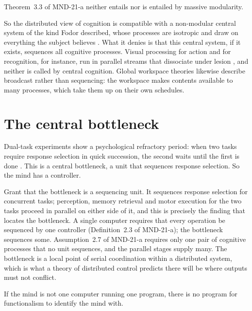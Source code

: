 \documentclass{situationist-preprint}
\begin{document}
\begin{corollary}\label{c:mod}
Theorem~3.3 of MND-21-a neither entails nor is entailed by massive modularity.
\end{corollary}

So the distributed view of cognition is compatible with a non-modular central system of the kind Fodor described, whose processes are isotropic and draw on everything the subject believes \citep{Fodor2000}. What it denies is that this central system, if it exists, sequences all cognitive processes. Visual processing for action and for recognition, for instance, run in parallel streams that dissociate under lesion \citep{MilnerGoodale1995}, and neither is called by central cognition. Global workspace theories \citep{Baars1988} likewise describe broadcast rather than sequencing: the workspace makes contents available to many processes, which take them up on their own schedules.

\section{The central bottleneck}

\begin{objection}
Dual-task experiments show a psychological refractory period: when two tasks require response selection in quick succession, the second waits until the first is done \citep{Pashler1994}. This is a central bottleneck, a unit that sequences response selection. So the mind has a controller.
\end{objection}

\begin{reply}
Grant that the bottleneck is a sequencing unit. It sequences response selection for concurrent tasks; perception, memory retrieval and motor execution for the two tasks proceed in parallel on either side of it, and this is precisely the finding that locates the bottleneck. A single computer requires that every operation be sequenced by one controller (Definition~2.3 of MND-21-a); the bottleneck sequences some. Assumption~2.7 of MND-21-a requires only one pair of cognitive processes that no unit sequences, and the parallel stages supply many. The bottleneck is a local point of serial coordination within a distributed system, which is what a theory of distributed control predicts there will be where outputs must not conflict.
\end{reply}

\begin{objection}
If the mind is not one computer running one program, there is no program for functionalism to identify the mind with.
\end{objection}
\end{document}

